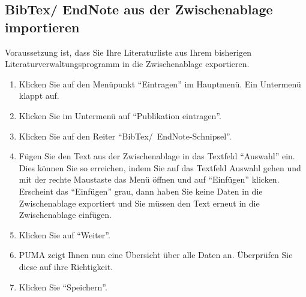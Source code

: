 \subsection{BibTex/ EndNote aus der Zwischenablage importieren}
\label{subsec:bibtexImportieren}
Voraussetzung ist, dass Sie Ihre Literaturliste aus Ihrem bisherigen Literaturverwaltungsprogramm in die Zwischenablage exportieren.
\begin{enumerate}
    \item Klicken Sie auf den Menüpunkt \enquote{Eintragen} im Hauptmenü. Ein Untermenü klappt auf.
    \item Klicken Sie im Untermenü auf \enquote{Publikation eintragen}.
    \item Klicken Sie auf den Reiter \enquote{BibTex/~EndNote-Schnipsel}.
    \item Fügen Sie den Text aus der Zwischenablage in das Textfeld \enquote{Auswahl} ein. Dies können Sie so erreichen, indem Sie auf das Textfeld Auswahl gehen und mit der rechte Maustaste das Menü öffnen und auf \enquote{Einfügen} klicken. Erscheint das \enquote{Einfügen} grau, dann haben Sie keine Daten in die Zwischenablage exportiert und Sie müssen den Text erneut in die Zwischenablage einfügen.
    \item Klicken Sie auf \enquote{Weiter}.
    \item PUMA zeigt Ihnen nun eine Übersicht über alle Daten an. Überprüfen Sie diese auf ihre Richtigkeit.
    \item Klicken Sie \enquote{Speichern}.
\end{enumerate}
